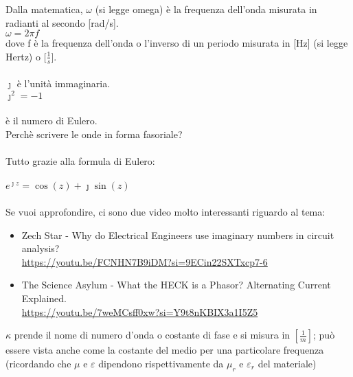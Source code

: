 \begin{tcolorbox}
    Dalla matematica, 
    $\omega$ (si legge omega) è la frequenza dell'onda misurata in radianti al secondo [rad/s]. \\ 
    $\omega = 2\pi f$ \\ 
    dove f è la frequenza dell'onda o l'inverso di un periodo misurata in [Hz] (si legge Hertz) o [$\frac{1}{s}$].  \\ \\ 
    
    $\jmath$ è l'unità immaginaria. \\ 
    $\jmath^{2} = -1$ \\ \\ 

    è il numero di Eulero. \\  



    Perchè scrivere le onde in forma fasoriale? \\ \\ 
    Tutto grazie alla formula di Eulero: \\ \\ 
    $e^{\jmath z} = \cos(z) + \jmath \sin(z)$ \\ \\

    Se vuoi approfondire, ci sono due video molto interessanti riguardo al tema: 

    \begin{itemize}
        \item Zech Star - Why do Electrical Engineers use imaginary numbers in circuit analysis? \\ \url{https://youtu.be/FCNHN7B9iDM?si=9ECin22SXTxcp7-6} 
        \item The Science Asylum - What the HECK is a Phasor? Alternating Current Explained. \\ \url{https://youtu.be/7weMCsff0xw?si=Y9t8nKBIX3a1I5Z5}
    \end{itemize}

    

\end{tcolorbox}

$\kappa$ prende il nome di numero d'onda o costante di fase e si misura in $[\frac{1}{m}]$; può essere vista 
anche come la costante del medio per una particolare frequenza (ricordando che $\mu$ e $\varepsilon$ dipendono rispettivamente da $\mu_r$ 
e $\varepsilon_r$ del materiale) \\ 

